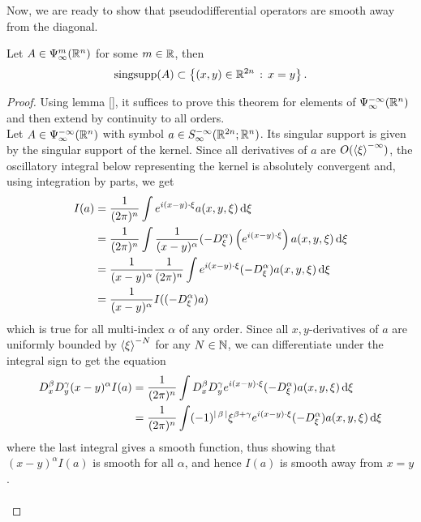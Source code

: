 \documentclass[12pt]{article}
\begin{document}
Now, we are ready to show that pseudodifferential operators are smooth away from the diagonal. 

\begin{fprop}
    Let $A \in \Psi^m_\infty(\R^n)$ for some $m \in \R$, then
    \[
    \mathrm{sing supp}(A) \subset \set{(x, y) \in \R^{2n} \wh x = y}. 
    \]
\end{fprop}
\begin{proof}
    Using lemma \ref{}, it suffices to prove this theorem for elements of $\Psi^{-\infty}_\infty(\R^n)$ and then extend by continuity to all orders. \\
    
    Let $A \in \Psi^{-\infty}_\infty(\R^n)$ with symbol $a \in S^{-\infty}_\infty(\R^{2n}; \R^n)$. Its singular support is given by the singular support of the kernel. Since all derivatives of $a$ are $O(\sym[\xi]^{-\infty})$, the oscillatory integral below representing the kernel is absolutely convergent  and, using integration by parts, we get
    \begin{align*}
        I(a) 
        & = \frac{1}{(2\pi)^n} \int e^{i(x - y) \cdot \xi} a(x, y, \xi) \d[\xi] \\
        & = \frac{1}{(2\pi)^n}  \int \frac{1}{(x - y)^\alpha} (-D^\alpha_\xi) \brac{e^{i(x - y) \cdot \xi} }a(x, y, \xi) \d[\xi] \\
        & = \frac{1}{(x - y)^\alpha} \frac{1}{(2\pi)^n} \int e^{i(x - y) \cdot \xi} (-D^\alpha_\xi) a(x, y, \xi) \d[\xi] \\
        & = \frac{1}{(x - y)^\alpha} I((-D^\alpha_\xi)a)
    \end{align*}
    which is true for all multi-index $\alpha$ of any order. Since all $x, y$-derivatives of $a$ are uniformly bounded by $\sym[\xi]^{-N}$ for any $N \in \N$, we can differentiate under the integral sign to get the equation
    \begin{align*}
        D^\beta_x D^\gamma_y (x - y)^\alpha I(a) 
        & = \frac{1}{(2\pi)^n} \int D^\beta_x D^\gamma_y e^{i(x - y) \cdot \xi} (-D^\alpha_\xi) a(x, y, \xi) \d[\xi] \\
        & = \frac{1}{(2\pi)^n} \int (-1)^{\abs{\beta}}\xi^{\beta + \gamma}e^{i(x - y) \cdot \xi} (-D^\alpha_\xi) a(x, y, \xi) \d[\xi] \\
    \end{align*}
    where the last integral gives a smooth function, thus showing that $(x - y)^\alpha I(a)$ is smooth for all $\alpha$, and hence $I(a)$ is smooth away from $x = y$. \\
    \\
%    
%    
\end{proof}
\end{document}
